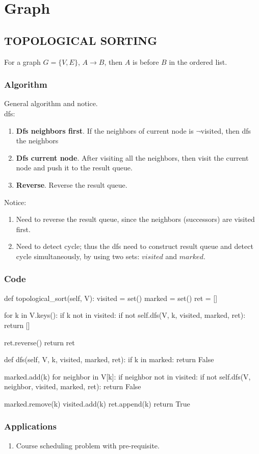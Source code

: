 \chapter{Graph}


\section{TOPOLOGICAL SORTING}
For a graph $G=\{V, E\}$, $ A \rightarrow B $, then $A$ is before $B$ in the ordered list. 
\subsection{Algorithm}
General algorithm and notice.\\
 
dfs:
\begin{enumerate}
\item \textbf{Dfs neighbors first}. If the neighbors of current node is  $\neg$visited, then dfs the neighbors
\item \textbf{Dfs current node}. After visiting all the neighbors, then visit the current node and push it to the result queue.
\item \textbf{Reverse}. Reverse the result queue. 
\end{enumerate}

Notice:
\begin{enumerate}
\item Need to reverse the result queue, since the neighbors (successors) are visited first. 
\item Need to detect cycle; thus the dfs need to construct result queue and detect cycle simultaneously, by using two sets: $visited$ and $marked$. 
\end{enumerate}

\subsection{Code}
\begin{python}
def topological_sort(self, V):
    visited = set()
    marked = set()
    ret = []

    for k in V.keys():
        if k not in visited:
            if not self.dfs(V, k, visited, marked, ret):
                return []

    ret.reverse()
    return ret

def dfs(self, V, k, visited, marked, ret):
    if k in marked:
        return False

    marked.add(k)
    for neighbor in V[k]:
        if neighbor not in visited:
            if not self.dfs(V, neighbor, visited, marked, ret):
                return False

    marked.remove(k)
    visited.add(k)
    ret.append(k)
    return True
\end{python}

\subsection{Applications}
\begin{enumerate}
\item Course scheduling problem with pre-requisite. 
\end{enumerate}

